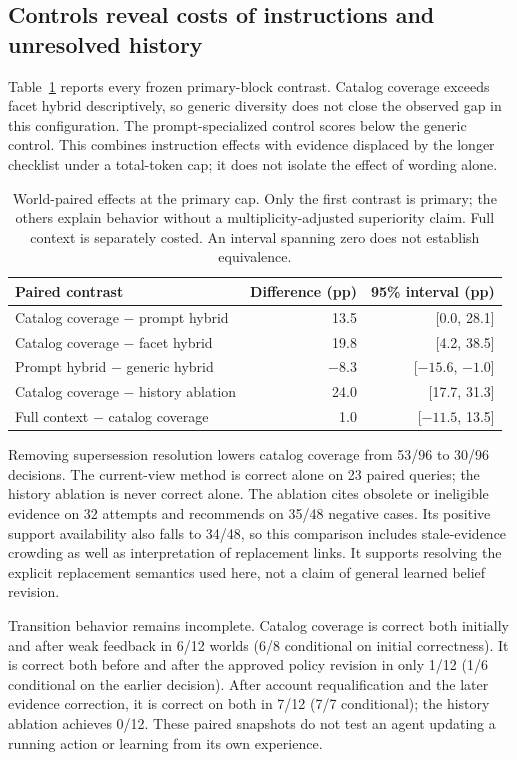 \subsection{Controls reveal costs of instructions and unresolved history}
Table~\ref{tab:contrasts} reports every frozen primary-block contrast. Catalog coverage exceeds facet hybrid descriptively, so generic diversity does not close the observed gap in this configuration. The prompt-specialized control scores below the generic control. This combines instruction effects with evidence displaced by the longer checklist under a total-token cap; it does not isolate the effect of wording alone.

\begin{table}[htbp]
\centering\small
\begin{tabular}{lrr}
\toprule
Paired contrast & Difference (pp) & 95\% interval (pp) \\
\midrule
Catalog coverage $-$ prompt hybrid & 13.5 & [0.0, 28.1] \\
Catalog coverage $-$ facet hybrid & 19.8 & [4.2, 38.5] \\
Prompt hybrid $-$ generic hybrid & $-8.3$ & [$-15.6$, $-1.0$] \\
Catalog coverage $-$ history ablation & 24.0 & [17.7, 31.3] \\
Full context $-$ catalog coverage & 1.0 & [$-11.5$, 13.5] \\
\bottomrule
\end{tabular}
\caption{World-paired effects at the primary cap. Only the first contrast is primary; the others explain behavior without a multiplicity-adjusted superiority claim. Full context is separately costed. An interval spanning zero does not establish equivalence.}
\label{tab:contrasts}
\end{table}

Removing supersession resolution lowers catalog coverage from 53/96 to 30/96 decisions. The current-view method is correct alone on 23 paired queries; the history ablation is never correct alone. The ablation cites obsolete or ineligible evidence on 32 attempts and recommends on 35/48 negative cases. Its positive support availability also falls to 34/48, so this comparison includes stale-evidence crowding as well as interpretation of replacement links. It supports resolving the explicit replacement semantics used here, not a claim of general learned belief revision.

Transition behavior remains incomplete. Catalog coverage is correct both initially and after weak feedback in 6/12 worlds (6/8 conditional on initial correctness). It is correct both before and after the approved policy revision in only 1/12 (1/6 conditional on the earlier decision). After account requalification and the later evidence correction, it is correct on both in 7/12 (7/7 conditional); the history ablation achieves 0/12. These paired snapshots do not test an agent updating a running action or learning from its own experience.

